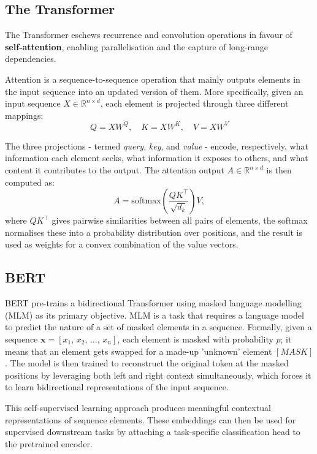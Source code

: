 \documentclass[11pt,a4paper,twoside]{article}
\begin{document}
\subsection{The Transformer}
The Transformer \cite{vaswani2017} eschews recurrence and convolution operations in favour of \textbf{self‑attention}, enabling parallelisation and the capture of long‑range dependencies. 

Attention is a sequence-to-sequence operation that mainly outputs elements in the input sequence into an updated version of them. More specifically, given an input sequence $X \in \mathbb{R}^{n \times d}$, each element is projected through three different mappings:
$$
	Q = XW^Q,\quad K = XW^K,\quad V = XW^V
$$

The three projections - termed \textit{query}, \textit{key}, and
\textit{value} - encode, respectively, what information each element
seeks, what information it exposes to others, and what content it
contributes to the output. The attention output $A \in \mathbb{R}^{n \times d}$ is then computed as:
$$
A = \text{softmax}\!\left(\frac{Q K^{\top}}{\sqrt{d_k}}\right)V,
$$
where $Q K^{\top}$ gives pairwise similarities between all pairs of
elements, the softmax normalises these into a probability distribution
over positions, and the result is used as weights for a convex combination
of the value vectors.

\subsection{BERT}
BERT \cite{devlin2018} pre-trains a bidirectional Transformer using masked language modelling (MLM) as its primary objective. MLM is a task that requires a language model to predict the nature of a set of masked elements in a sequence. Formally, given a sequence $\mathbf{x} = [x_1,\,x_2,\,\dots,\,x_n]$, each element is masked with probability $p$; it means that an element gets swapped for a made-up 'unknown' element $[MASK]$. The model is then trained to reconstruct the original token at the masked positions by leveraging both left and right context simultaneously, which forces it to learn bidirectional representations of the input sequence.

This self-supervised learning approach produces meaningful contextual
representations of sequence elements. These embeddings can then be used for supervised downstream tasks by attaching a task-specific classification head to the pretrained encoder.
\end{document}
